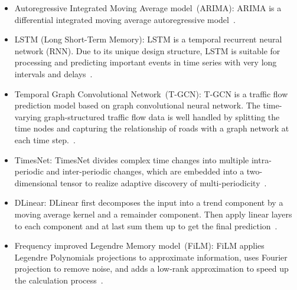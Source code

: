 \documentclass[lettersize,journal]{IEEEtran}
\begin{document}
\begin{itemize}
\item Autoregressive Integrated Moving Average model~(ARIMA): ARIMA is a differential integrated moving average autoregressive model~\cite{arima}.

\item LSTM (Long Short-Term Memory): LSTM is a temporal recurrent neural network (RNN). Due to its unique design structure, LSTM is suitable for processing and predicting important events in time series with very long intervals and delays~\cite{lstm}. 

\item Temporal Graph Convolutional Network~(T-GCN): T-GCN is a traffic flow prediction model based on graph convolutional neural network. The time-varying graph-structured traffic flow data is well handled by splitting the time nodes and capturing the relationship of roads with a graph network at each time step.~\cite{tgcn}.


\item TimesNet: TimesNet divides complex time changes into multiple intra-periodic and inter-periodic changes, which are embedded into a two-dimensional tensor to realize adaptive discovery of multi-periodicity~\cite{DBLP:conf/iclr/WuHLZ0L23}.

\item DLinear: DLinear first decomposes the input into a trend component by a moving average kernel and a remainder component. Then apply linear layers to each component and at last sum them up to get the final prediction~\cite {aaai/ZengCZ023}.

\item Frequency improved Legendre Memory model~(FiLM): FiLM applies Legendre Polynomials projections to approximate information, uses Fourier projection to remove noise, and adds a low-rank approximation to speed up the calculation process~\cite{nips/ZhouMWW0YY022}.

\end{itemize}
\end{document}
